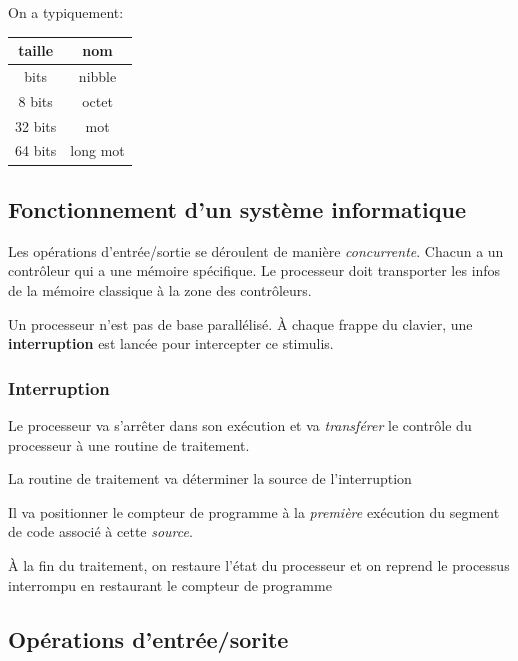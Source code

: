 On a typiquement:

\begin{longtable}[]{@{}cc@{}}
\toprule\noalign{}
taille & nom \\
\midrule\noalign{}
\endhead
\bottomrule\noalign{}
\endlastfoot
4 bits & nibble \\
8 bits & octet \\
32 bits & mot \\
64 bits & long mot \\
\end{longtable}

\subsection{Fonctionnement d'un système
informatique}\label{fonctionnement-dun-systuxe8me-informatique}

Les opérations d'entrée/sortie se déroulent de manière
\emph{concurrente}. Chacun a un contrôleur qui a une mémoire spécifique.
Le processeur doit transporter les infos de la mémoire classique à la
zone des contrôleurs.

Un processeur n'est pas de base parallélisé. À chaque frappe du clavier,
une \textbf{interruption} est lancée pour intercepter ce stimulis.

\subsubsection{Interruption}\label{interruption}

Le processeur va s'arrêter dans son exécution et va \emph{transférer} le
contrôle du processeur à une routine de traitement.

La routine de traitement va déterminer la source de l'interruption

Il va positionner le compteur de programme à la \emph{première}
exécution du segment de code associé à cette \emph{source}.

À la fin du traitement, on restaure l'état du processeur et on reprend
le processus interrompu en restaurant le compteur de programme

\subsection{Opérations
d'entrée/sorite}\label{opuxe9rations-dentruxe9esorite}

